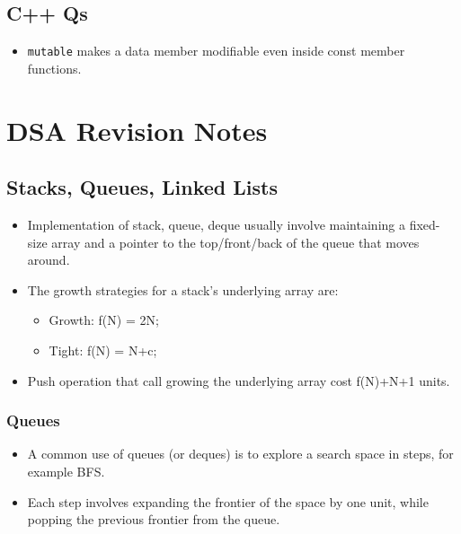 \documentclass{report}
\begin{document}
\section{C++ Qs}
\begin{itemize}
\item \texttt{mutable} makes a data member modifiable even inside const member functions.
\end{itemize}
\chapter{DSA Revision Notes}
\section{Stacks, Queues, Linked Lists}
\begin{itemize}
\item Implementation of stack, queue, deque usually involve maintaining a
fixed-size array and a pointer to the top/front/back of the queue that moves around.
\item The growth strategies for a stack's underlying array are:
\begin{itemize}
    \item Growth: f(N) = 2N;
    \item Tight: f(N) = N+c;
\end{itemize}
\item Push operation that call growing the underlying array cost f(N)+N+1 units.
\end{itemize}
\subsection{Queues}
\begin{itemize}
\item A common use of queues (or deques) is to explore a search space in steps, for example BFS.
\item Each step involves expanding the frontier of the space by one unit, while popping the previous frontier from the queue.
\end{itemize}
\end{document}
